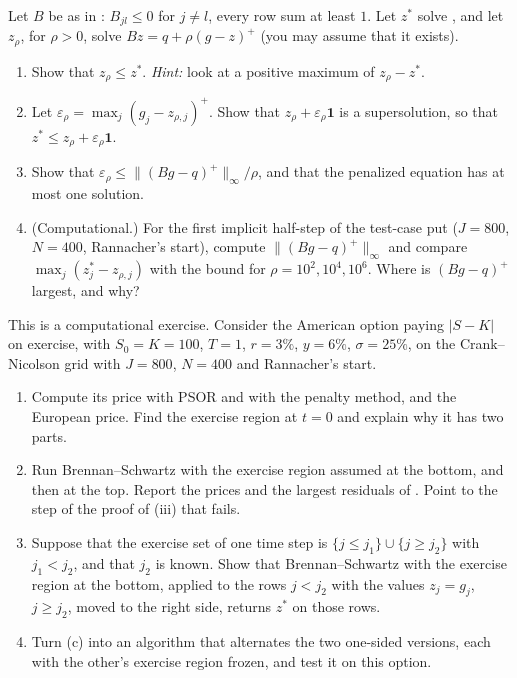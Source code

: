\begin{exercise}\label{ex:fd-penalty}
\hard Let $B$ be as in : $B_{jl}\le0$ for $j\ne l$, every row sum at least $1$. Let
$z^*$ solve , and let $z_\rho$, for $\rho>0$, solve $Bz=q+\rho(g-z)^+$ (you may assume that
it exists).
\begin{enumerate}[label=(\alph*)]
  \item Show that $z_\rho\le z^*$. \emph{Hint:} look at a positive maximum of $z_\rho-z^*$.
  \item Let $\varepsilon_\rho=\max_j(g_j-z_{\rho,j})^+$. Show that $z_\rho+\varepsilon_\rho\mathbf 1$ is a supersolution, so that $z^*\le z_\rho+\varepsilon_\rho\mathbf 1$.
  \item Show that $\varepsilon_\rho\le\|(Bg-q)^+\|_\infty/\rho$, and that the penalized equation has at most one
    solution.
  \item (Computational.) For the first implicit half-step of the test-case put ($J=800$, $N=400$,
    Rannacher's start), compute $\|(Bg-q)^+\|_\infty$ and compare $\max_j(z^*_j-z_{\rho,j})$ with the bound for
    $\rho=10^2,10^4,10^6$. Where is $(Bg-q)^+$ largest, and why?
\end{enumerate}
\end{exercise}

\begin{exercise}\label{ex:fd-straddle}
\hard This is a computational exercise. Consider the American option paying $|S-K|$ on exercise,
with $S_0=K=100$, $T=1$, $r=3\%$, $y=6\%$, $\sigma=25\%$, on the Crank--Nicolson grid with $J=800$,
$N=400$ and Rannacher's start.
\begin{enumerate}[label=(\alph*)]
  \item Compute its price with PSOR and with the penalty method, and the European price. Find
    the exercise region at $t=0$ and explain why it has two parts.
  \item Run Brennan--Schwartz with the exercise region assumed at the bottom, and then at the top.
    Report the prices and the largest residuals of . Point to the step of the
    proof of (iii) that fails.
  \item Suppose that the exercise set of one time step is $\{j\le j_1\}\cup\{j\ge j_2\}$ with $j_1<j_2$, and
    that $j_2$ is known. Show that Brennan--Schwartz with the exercise region at the bottom, applied
    to the rows $j<j_2$ with the values $z_j=g_j$, $j\ge j_2$, moved to the right side, returns $z^*$ on
    those rows.
  \item Turn (c) into an algorithm that alternates the two one-sided versions, each with the
    other's exercise region frozen, and test it on this option.
\end{enumerate}
\end{exercise}
